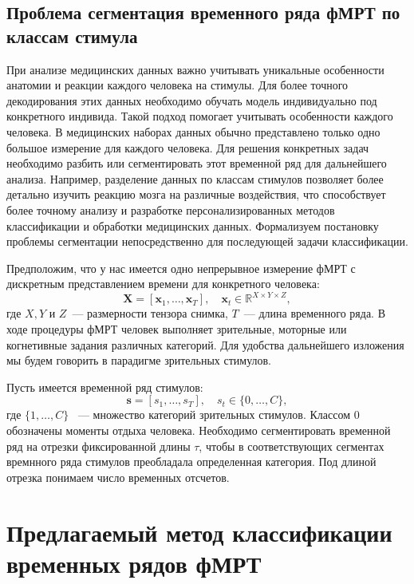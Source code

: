 \documentclass[a4paper, 12pt]{extarticle}
\begin{document}
\subsection{Проблема сегментация временного ряда фМРТ по классам стимула}
При анализе медицинских данных важно учитывать уникальные особенности анатомии и реакции каждого человека на стимулы. Для более точного декодирования этих данных необходимо обучать модель индивидуально под конкретного индивида. Такой подход помогает учитывать особенности каждого человека. В медицинских наборах данных обычно представлено только одно большое измерение для каждого человека. Для решения конкретных задач необходимо разбить или сегментировать этот временной ряд для дальнейшего анализа. 
Например, разделение данных по классам стимулов позволяет более детально изучить реакцию мозга на различные воздействия, что способствует более точному анализу и разработке персонализированных методов классификации и обработки медицинских данных.
Формализуем постановку проблемы сегментации непосредственно для последующей задачи классификации.

Предположим, что у нас имеется одно непрерывное измерение фМРТ с дискретным представлением времени для конкретного человека:
\begin{equation*}
	\bm{X} = [\bm{x}_{1}, \ldots, \bm{x}_{T}], \quad \bm{x}_{t} \in \mathbb{R}^{X \times Y \times Z},
\end{equation*}
где $X, Y$ и $Z$~--- размерности тензора снимка, $T$~--- длина временного ряда. 
В ходе процедуры фМРТ человек выполняет зрительные, моторные или когнетивные задания различных категорий.  
Для удобства дальнейшего изложения мы будем говорить в парадигме зрительных стимулов.

Пусть имеется временной ряд стимулов:
\begin{equation*}
	\bm{s} = [{s}_{1}, \ldots, {s}_{T}], \quad {s}_{t} \in \{0,\dots, C\},
\end{equation*}
где $\{1,\dots, C\}$ ~--- множество категорий зрительных стимулов.
Классом $0$ обозначены моменты отдыха человека.
Необходимо сегментировать временной ряд на отрезки фиксированной длины $\tau$, чтобы в соответствующих сегментах времнного ряда стимулов преобладала определенная категория. Под длиной отрезка понимаем число временных отсчетов.


\section{Предлагаемый метод классификации временных рядов фМРТ}
\end{document}
